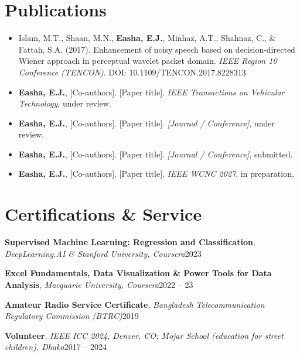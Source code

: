 \documentclass[10pt,letterpaper]{article}
\begin{document}
\section*{Publications}
\begin{itemize}\item Islam, M.T., Shaan, M.N., \textbf{Easha, E.J.}, Minhaz, A.T., Shahnaz, C., \& Fattah, S.A. (2017). Enhancement of noisy speech based on decision-directed Wiener approach in perceptual wavelet packet domain. \textit{IEEE Region 10 Conference (TENCON)}. DOI: 10.1109/TENCON.2017.8228313\item \textbf{Easha, E.J.}, [Co-authors]. [Paper title]. \textit{IEEE Transactions on Vehicular Technology}, under review.\item \textbf{Easha, E.J.}, [Co-authors]. [Paper title]. \textit{[Journal / Conference]}, under review.\item \textbf{Easha, E.J.}, [Co-authors]. [Paper title]. \textit{[Journal / Conference]}, submitted.\item \textbf{Easha, E.J.}, [Co-authors]. [Paper title]. \textit{IEEE WCNC 2027}, in preparation.\end{itemize}
\section*{Certifications \& Service}
\textbf{Supervised Machine Learning: Regression and Classification}, \textit{DeepLearning.AI \& Stanford University, Coursera}\hfill 2023\par\textbf{Excel Fundamentals, Data Visualization \& Power Tools for Data Analysis}, \textit{Macquarie University, Coursera}\hfill 2022 – 23\par\textbf{Amateur Radio Service Certificate}, \textit{Bangladesh Telecommunication Regulatory Commission (BTRC)}\hfill 2019\par\textbf{Volunteer}, \textit{IEEE ICC 2024, Denver, CO; Mojar School (education for street children), Dhaka}\hfill 2017 – 2024\par
\end{document}
